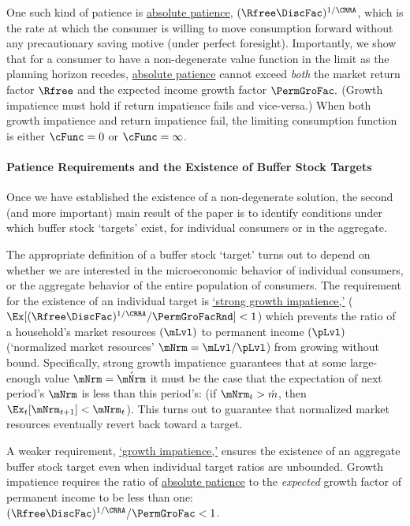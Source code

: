 \documentclass[BufferStockTheory]{subfiles}
\begin{document}

One such kind of patience is \hyperlink{APFac}{absolute patience}, $\APFacRaw$, which is the rate at which the consumer is willing to move consumption forward without any precautionary saving motive (under perfect foresight). Importantly, we show that for a consumer to have a non-degenerate value function in the limit as the planning horizon recedes, \hyperlink{APFac}{absolute patience} cannot exceed \textit{both} the market return factor $\Rfree$ and the expected income growth factor $\PermGroFac.$
(Growth impatience must hold if return impatience fails and vice-versa.)
When both growth impatience and return impatience fail, the limiting consumption function is either $\cFunc=0$ or $\cFunc=\infty$. 



\paragraph{Patience Requirements and the Existence of Buffer Stock Targets}

Once we have established the existence of a non-degenerate solution, the second (and more important) main result of the paper is to identify conditions under which buffer stock `targets' exist, for individual consumers or in the aggregate.

The appropriate definition of a buffer stock `target' turns out to depend on whether we are interested in the microeconomic behavior of individual consumers, or the aggregate behavior of the entire population of consumers.
The requirement for the existence of an individual target is \hyperlink{GICMod}{`strong growth impatience,'} ($\Ex[\APFacRaw/\PermGroFacRnd] < 1$) which prevents the ratio of a household's market resources $(\mLvl)$ to permanent income $(\pLvl)$ (`normalized market resources' $\mNrm = \mLvl/\pLvl$) from growing without bound.
Specifically, strong growth impatience guarantees that at some large-enough value $\mNrm = \acute{\mNrm}$ it must be the case that the expectation of next period's $\mNrm$ is less than this period's: (if $\mNrm_{t} > \acute{m}$, then $\Ex_{t}[\mNrm_{t+1}] < \mNrm_{t}$). 
This turns out to guarantee that normalized market resources eventually revert back toward a target.

A weaker requirement, \hyperlink{GICRaw}{`growth impatience,'} ensures the existence of an aggregate buffer stock target even when individual target ratios are unbounded.
Growth impatience requires the ratio of \hyperlink{APFacDefn}{absolute patience} to the \textit{expected} growth factor of permanent income to be less than one: $\APFacRaw/\PermGroFac < 1$.
\end{document}

